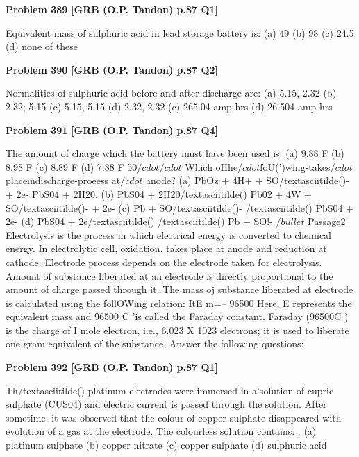 \begin{problembox}
\textbf{Problem 389} \hfill \textbf{[GRB (O.P. Tandon) p.87 Q1]}
\label{q:ext-grb_all_questions-389}

Equivalent mass of sulphuric acid in lead storage battery is: 
(a) 49 
(b) 98 
(c) 24.5 
(d) none of these
\end{problembox}

\begin{problembox}
\textbf{Problem 390} \hfill \textbf{[GRB (O.P. Tandon) p.87 Q2]}
\label{q:ext-grb_all_questions-390}

Normalities of sulphuric acid before and after discharge are: 
(a) 5.15, 2.32 (b) 2.32; 5.15 (c) 5.15, 5.15 (d) 2.32, 2.32 
(c) 265.04 amp-hrs 
(d) 26.504 amp-hrs
\end{problembox}

\begin{problembox}
\textbf{Problem 391} \hfill \textbf{[GRB (O.P. Tandon) p.87 Q4]}
\label{q:ext-grb_all_questions-391}

The amount of charge which the battery must have been used 
is: 
(a) 9.88 F 
(b) 8.98 F 
(c) 8.89 F 
(d) 7.88 F 
50$/cdot$$/cdot$ Which oHhe$/cdot$foU(')wing-takes$/cdot$placeindischarge-proeess at$/cdot$ 
anode? 
(a) PbOz + 4H+ + SO/textasciitilde()- + 2e-
PbS04 + 2H20. 
(b) PbS04 + 2H20/textasciitilde() Pb02 + 4W + SO/textasciitilde()- + 2e-
(c) Pb + SO/textasciitilde()- /textasciitilde() 
PbS04 + 2e-
(d) PbS04 + 2e/textasciitilde() /textasciitilde() 
Pb + SO!-
$/bullet$ Passage2 
Electrolysis is the process in which electrical energy is converted 
to chemical energy. In electrolytic cell, oxidation. takes place at 
anode and reduction at cathode. Electrode process depends on the 
electrode taken for electrolysis. Amount of substance liberated at an 
electrode is directly proportional to the amount of charge passed 
through it. The mass oj substance liberated at electrode is calculated 
using the follOWing relation: 
ItE 
m=--
96500 
Here, E represents the equivalent mass and 96500 C 'is called the 
Faraday constant. Faraday (96500C ) is the charge of I mole 
electron, i.e., 6.023 X 1023 electrons; it is used to liberate one gram 
equivalent of the substance. 
Answer the following questions:
\end{problembox}

\begin{problembox}
\textbf{Problem 392} \hfill \textbf{[GRB (O.P. Tandon) p.87 Q1]}
\label{q:ext-grb_all_questions-392}

Th/textasciitilde() platinum electrodes were immersed in a'solution of cupric 
sulphate (CUS04) and electric current is passed through the 
solution. After sometime, it was observed that the colour of 
copper sulphate disappeared with evolution of a gas at the 
electrode. The colourless solution contains: 
. (a) platinum sulphate 
(b) copper nitrate 
(c) copper sulphate 
(d) sulphuric acid
\end{problembox}

